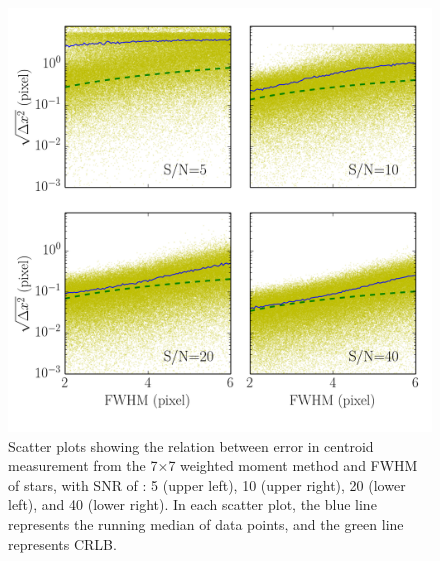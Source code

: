 \documentclass[12pt, preprint]{aastex}
\begin{document}
\begin{figure}[!htb]
  \includegraphics[width=\linewidth]{fwhm_moment.png}
\endminipage
\caption{Scatter plots showing the relation between error in centroid
measurement from the 7$\times$7 weighted moment method and FWHM of stars,
with SNR  of : 5 (upper left), 10 (upper right), 20 (lower left), and 40 (lower right).
In each scatter plot, the blue line represents the running median of data points,
and the green line represents CRLB.}\label{10}
\end{figure}
\end{document}
